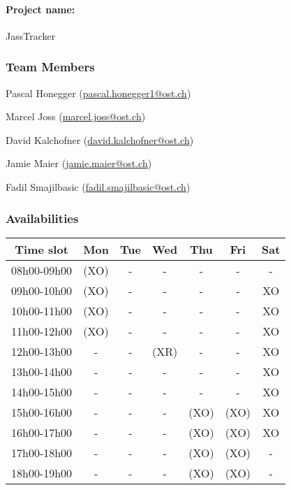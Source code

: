 \paragraph{Project name:} JassTracker

\subsubsection*{Team Members}

\begin{compactenum}
    \item Pascal Honegger (\href{mailto:pascal.honegger1@ost.ch}{pascal.honegger1@ost.ch})
    \item Marcel Joss (\href{mailto:marcel.joss@ost.ch}{marcel.joss@ost.ch})
    \item David Kalchofner (\href{mailto:david.kalchofner@ost.ch}{david.kalchofner@ost.ch})
    \item Jamie Maier (\href{mailto:jamie.maier@ost.ch}{jamie.maier@ost.ch})
    \item Fadil Smajilbasic (\href{mailto:fadil.smajilbasic@ost.ch}{fadil.smajilbasic@ost.ch})
\end{compactenum}

\subsubsection*{Availabilities}


\begin{flushleft}
    \begin{tabular}{|c|c|c|c|c|c|c|}
        \hline
        Time slot   & Mon  & Tue  & Wed  & Thu  & Fri  & Sat \\ \hline
        08h00-09h00 & (XO) &  -   &  -   &  -   &  -   &  -  \\ \hline
        09h00-10h00 & (XO) &  -   &  -   &  -   &  -   & XO  \\ \hline
        10h00-11h00 & (XO) &  -   &  -   &  -   &  -   & XO  \\ \hline
        11h00-12h00 & (XO) &  -   &  -   &  -   &  -   & XO  \\ \hline
        \rowcolor[HTML]{EFEFEF}
        12h00-13h00 &  -   &  -   & (XR) &  -   &  -   & XO  \\ \hline
        13h00-14h00 &  -   &  -   &  -   &  -   &  -   & XO  \\ \hline
        14h00-15h00 &  -   &  -   &  -   &  -   &  -   & XO  \\ \hline
        15h00-16h00 &  -   &  -   &  -   & (XO) & (XO) & XO  \\ \hline
        16h00-17h00 &  -   &  -   &  -   & (XO) & (XO) & XO  \\ \hline
        \rowcolor[HTML]{EFEFEF}
        17h00-18h00 &  -   &  -   &  -   & (XO) & (XO) &  -  \\ \hline
        \rowcolor[HTML]{EFEFEF}
        18h00-19h00 &  -   &  -   &  -   & (XO) & (XO) &  -  \\ \hline
    \end{tabular}

\end{flushleft}


